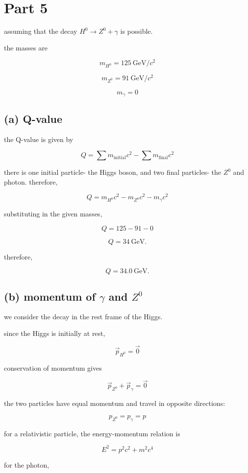 \documentclass{article}
\begin{document}
\section{Part 5}

assuming that the decay $H^0\rightarrow Z^0+\gamma$ is possible.

the masses are

\[
m_{H^0}=125~\mathrm{GeV}/c^2
\]

\[
m_{Z^0}=91~\mathrm{GeV}/c^2
\]

\[
m_{\gamma}=0
\]

\subsection{(a) Q-value}

the Q-value is given by

\[
Q=\sum m_{\mathrm{initial}}c^2 - \sum m_{\mathrm{final}}c^2
\]

there is one initial particle- the Higgs boson, and two final particles- the $Z^0$ and photon. therefore,

\[
Q = m_{H^0}c^2 - m_{Z^0}c^2 - m_{\gamma}c^2
\]

substituting in the given masses,

\[
Q = 125-91-0
\]

\[
Q=34~\mathrm{GeV}.
\]

therefore,

\[
\boxed{Q=34.0~\mathrm{GeV}}.
\]

\subsection{(b) momentum of $\gamma$ and $Z^0$}

we consider the decay in the rest frame of the Higgs.

since the Higgs is initially at rest,

\[
\vec{p}_{H^0}=\vec{0}
\]

conservation of momentum gives

\[
\vec{p}_{Z^0}+\vec{p}_{\gamma}=\vec{0}
\]

the two particles have equal momentum and travel in opposite directions:

\[
p_{Z^0}=p_{\gamma}=p
\]

for a relativistic particle, the energy-momentum relation is

\[
E^2=p^2c^2+m^2c^4
\]

for the photon,
\end{document}
